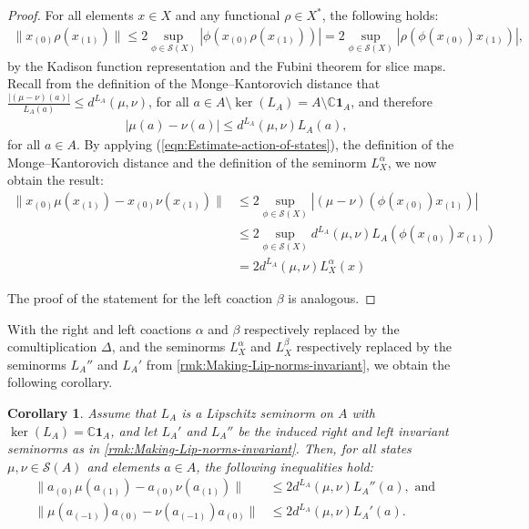 \documentclass{amsart}
\theoremstyle{plain}
\newtheorem{corollary}[theorem]{Corollary}
\theoremstyle{definition}
\theoremstyle{remark}
\begin{document}
	\begin{proof}
		For all elements $x \in X$ and any functional $\rho \in X^*$, the following holds:
		\begin{align}\label{eqn:Estimate-action-of-states}
			\lVert x_{(0)}\rho(x_{(1)})\rVert
			\leq 2 \sup_{\phi \in \mathcal{S}(X)} |\phi(x_{(0)}\rho(x_{(1)}))| 
			= 2 \sup_{\phi \in \mathcal{S}(X)} |\rho(\phi(x_{(0)})x_{(1)})|,
		\end{align}
		by the Kadison function representation and the Fubini theorem for slice maps. 
		Recall from the definition of the Monge--Kantorovich distance that $\frac{|(\mu-\nu)(a)|}{L_A(a)} \leq d^{L_A}(\mu,\nu)$, for all $a \in A \setminus \ker(L_A) = A \setminus \mathbb{C}\mathbf{1}_A$, and therefore \begin{align}
			|\mu(a)-\nu(a)| \leq d^{L_A}(\mu,\nu) L_A(a),
		\end{align} for all $a \in A$.
		By applying (\ref{eqn:Estimate-action-of-states}), the definition of the Monge--Kantorovich distance and the definition of the seminorm $L_X^\alpha$, we now obtain the result:
		\begin{align}
			\lVert x_{(0)}\mu(x_{(1)}) - x_{(0)}\nu(x_{(1)})\rVert
			&\leq 2 \sup_{\phi \in \mathcal{S}(X)} |(\mu-\nu)(\phi(x_{(0)})x_{(1)})| \\
			&\leq 2 \sup_{\phi \in \mathcal{S}(X)} d^{L_A}(\mu,\nu) L_A(\phi(x_{(0)})x_{(1)}) \\
			&= 2 d^{L_A}(\mu,\nu) L_X^\alpha(x) 
		\end{align}
		
		The proof of the statement for the left coaction $\beta$ is analogous.
	\end{proof}
	
	With the right and left coactions $\alpha$ and $\beta$ respectively replaced by the comultiplication $\Delta$, and the seminorms $L_X^\alpha$ and $L_X^\beta$ respectively replaced by the seminorms $L_A''$ and $L_A'$ from \autoref{rmk:Making-Lip-norms-invariant}, we obtain the following corollary.
	
	\begin{corollary}\label{cor:Lip-estimate-for-action-Alg}
		Assume that $L_A$ is a Lipschitz seminorm on $A$ with
		$\ker(L_A) = \mathbb{C}\mathbf{1}_A$, and let $L_A'$ and $L_A''$ be the induced right and left invariant seminorms as in \autoref{rmk:Making-Lip-norms-invariant}. 
		Then, for all states $\mu, \nu \in \mathcal{S}(A)$ and elements $a \in A$, the following inequalities hold:
		\begin{align}
			\lVert a_{(0)}\mu(a_{(1)}) - a_{(0)}\nu(a_{(1)})\rVert &\leq 2 d^{L_A}(\mu,\nu) L_A''(a), \text{ and } \\
			\lVert \mu(a_{(-1)})a_{(0)} - \nu(a_{(-1)})a_{(0)}\rVert &\leq 2 d^{L_A}(\mu,\nu) L_A'(a).
		\end{align}
	\end{corollary}
	
\end{document}
